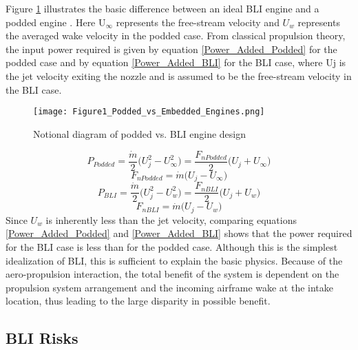 \indent Figure \ref{Podded_vs_Embedded_Engines} illustrates the basic difference between an ideal BLI engine and a podded engine \cite{PlasThesis}.  Here U$_\infty$ represents the free-stream velocity and $U_w$ represents the averaged wake velocity in the podded case. From classical propulsion theory, the input power required is given by equation \ref{Power_Added_Podded} for the podded case and by equation \ref{Power_Added_BLI} for the BLI case, where Uj is the jet velocity exiting the nozzle and is assumed to be the free-stream velocity in the BLI case.
    \begin{figure}
    \centering
    \texttt{[image: Figure1\_Podded\_vs\_Embedded\_Engines.png]}
    \caption{Notional diagram of podded vs. BLI engine design}
    \label{Podded_vs_Embedded_Engines}
    \end{figure}
\begin{equation}P_{Podded}= \frac{\dot{m}}{2}\big(U_j^2-U_\infty^2\big) = \frac{F_{n Podded}}{2}\big(U_j+U_\infty\big)\label{Power_Added_Podded}\end{equation}
\begin{equation}F_{n Podded}= \dot{m}\big(U_j-U_\infty\big) \label{Net_Thrust_Podded}\end{equation}
\begin{equation}P_{BLI}= \frac{\dot{m}}{2}\big(U_j^2-U_w^2\big) = \frac{F_{n BLI}}{2}\big(U_j +U_w\big)\label{Power_Added_BLI}\end{equation}
\begin{equation}F_{n BLI}= \dot{m}\big(U_j-U_w\big) \label{Net_Thrust_BLI}\end{equation}
Since $U_w$ is inherently less than the jet velocity, comparing equations \ref{Power_Added_Podded} and \ref{Power_Added_BLI} shows that the power required for the BLI case is less than for the podded case.  Although this is the simplest idealization of BLI, this is sufficient to explain the basic physics.  Because of the aero-propulsion interaction, the total benefit of the system is dependent on the propulsion system arrangement and the incoming airframe wake at the intake location, thus leading to the large disparity in possible benefit. 
\subsection{BLI Risks}

